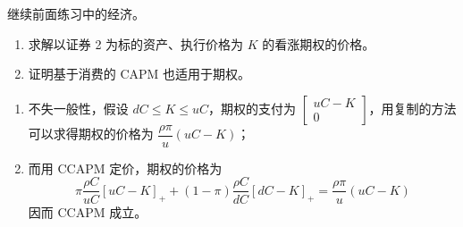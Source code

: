 \begin{problem}
 继续前面练习中的经济。
\begin{enumerate}[label=(\alph*)]
    \item 求解以证券 2 为标的资产、执行价格为 $K$ 的看涨期权的价格。
    \item 证明基于消费的 CAPM 也适用于期权。
\end{enumerate}
\end{problem}
\begin{solution}
\begin{enumerate}[label=(\alph*)]
    \item 不失一般性，假设 $dC\le K\le uC$，期权的支付为 $\begin{bmatrix}uC-K \\ 0\end{bmatrix}$，用复制的方法可以求得期权的价格为 $\dfrac{\rho\pi}{u}(uC-K)$；
    \item 而用 CCAPM 定价，期权的价格为
    \[
        \pi\frac{\rho C}{uC}[uC-K]_{+}+(1-\pi)\frac{\rho C}{dC}[dC-K]_{+}=\frac{\rho\pi}{u}(uC-K)
    \]
    因而 CCAPM 成立。
\end{enumerate}
\end{solution}


